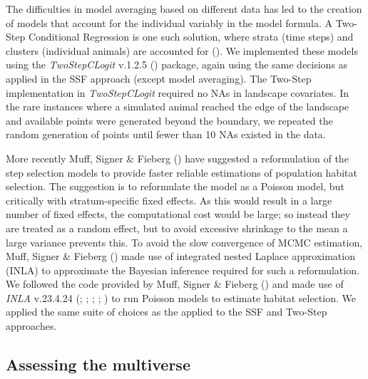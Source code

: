 \documentclass[10pt,a4paper]{article}
\begin{document}
The difficulties in model averaging based on different data has led to the creation of models that account for the individual variably in the model formula.
A Two-Step Conditional Regression is one such solution, where strata (time steps) and clusters (individual animals) are accounted for ().
We implemented these models using the \emph{TwoStepCLogit} v.1.2.5 () package, again using the same decisions as applied in the SSF approach (except model averaging).
The Two-Step implementation in \emph{TwoStepCLogit} required no NAs in landscape covariates.
In the rare instances where a simulated animal reached the edge of the landscape and available points were generated beyond the boundary, we repeated the random generation of points until fewer than 10 NAs existed in the data.

More recently Muff, Signer \& Fieberg () have suggested a reformulation of the step selection models to provide faster reliable estimations of population habitat selection.
The suggestion is to reformulate the model as a Poisson model, but critically with stratum-specific fixed effects.
As this would result in a large number of fixed effects, the computational cost would be large; so instead they are treated as a random effect, but to avoid excessive shrinkage to the mean a large variance prevents this.
To avoid the slow convergence of MCMC estimation, Muff, Signer \& Fieberg () made use of integrated nested Laplace approximation (INLA) to approximate the Bayesian inference required for such a reformulation.
We followed the code provided by Muff, Signer \& Fieberg () and made use of \emph{INLA} v.23.4.24 (; ; ; ; ) to run Poisson models to estimate habitat selection.
We applied the same suite of choices as the applied to the SSF and Two-Step approaches.

\subsection{Assessing the multiverse}\label{assessing-the-multiverse}
\end{document}
